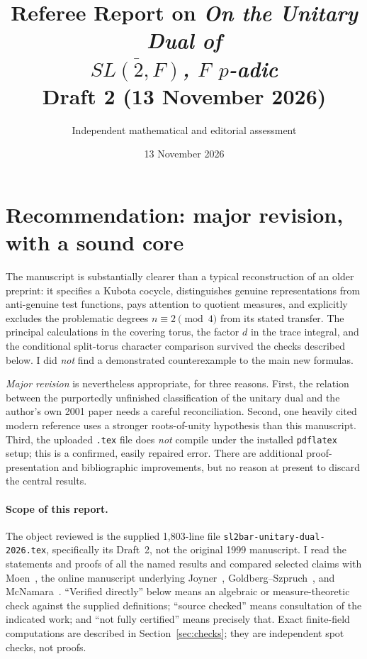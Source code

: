 \documentclass[12pt,letterpaper]{article}
\title{Referee Report on \emph{On the Unitary Dual of\\ $\overline{SL(2,F)}$, $F$ $p$-adic}\\[5pt]
\large Draft 2 (13 November 2026)}
\author{Independent mathematical and editorial assessment}
\date{13 November 2026}
\begin{document}
\maketitle

\section*{Recommendation: major revision, with a sound core}

The manuscript is substantially clearer than a typical reconstruction of an older preprint: it specifies a Kubota cocycle, distinguishes genuine representations from anti-genuine test functions, pays attention to quotient measures, and explicitly excludes the problematic degrees $n\equiv2\pmod4$ from its stated transfer.  The principal calculations in the covering torus, the factor $d$ in the trace integral, and the conditional split-torus character comparison survived the checks described below.  I did \emph{not} find a demonstrated counterexample to the main new formulas.

\emph{Major revision} is nevertheless appropriate, for three reasons. First, the relation between the purportedly unfinished classification of the unitary dual and the author's own 2001 paper needs a careful reconciliation. Second, one heavily cited modern reference uses a stronger roots-of-unity hypothesis than this manuscript. Third, the uploaded \texttt{.tex} file does \emph{not} compile under the installed \texttt{pdflatex} setup; this is a confirmed, easily repaired error.  There are additional proof-presentation and bibliographic improvements, but no reason at present to discard the central results.

\paragraph{Scope of this report.}
The object reviewed is the supplied 1,803-line file \texttt{sl2bar-unitary-\allowbreak dual-2026.tex}, specifically its Draft~2, not the original 1999 manuscript.  I read the statements and proofs of all the named results and compared selected claims with Moen~\cite{Mo88}, the online manuscript underlying Joyner~\cite{Jo01}, Goldberg--Szpruch~\cite{GS16}, and McNamara~\cite{Mc12}.  ``Verified directly'' below means an algebraic or measure-theoretic check against the supplied definitions; ``source checked'' means consultation of the indicated work; and ``not fully certified'' means precisely that.  Exact finite-field computations are described in Section~\ref{sec:checks}; they are independent spot checks, not proofs.
\end{document}

